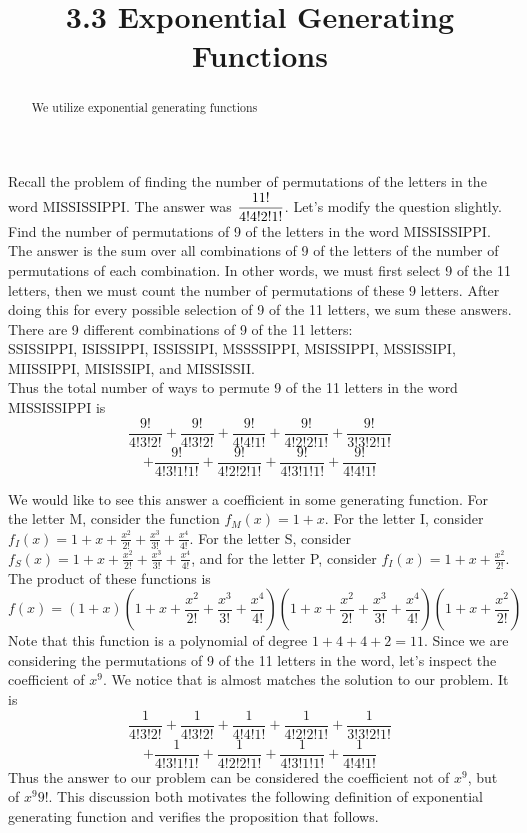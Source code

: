 \documentclass[handout]{ximera}
\title{3.3 Exponential Generating Functions}
\begin{document}
\begin{abstract}
We utilize exponential generating functions
\end{abstract}

\maketitle

Recall the problem of finding the number of permutations of the letters in the word MISSISSIPPI. The answer was $\displaystyle \frac{11!}{4!4!2!1!}$.
Let's modify the question slightly.  Find the number of permutations of 9 of the letters in the word MISSISSIPPI. 
The answer is the sum over all combinations of 9 of the letters of the number of permutations of each combination. 
In other words, we must first select 9 of the 11 letters, then we must count the number of permutations of these 9 letters.  
After doing this for every possible selection of 9 of the 11 letters, we sum these answers.
There are 9 different combinations of 9 of the 11 letters:\\
SSISSIPPI, ISISSIPPI, ISSISSIPI, MSSSSIPPI, MSISSIPPI, MSSISSIPI, MIISSIPPI, MISISSIPI, and MISSISSII.\\
Thus the total number of ways to permute 9 of the 11 letters in the word MISSISSIPPI is
\[
\frac{9!}{4!3!2!} + \frac{9!}{4!3!2!} + \frac{9!}{4!4!1!} + \frac{9!}{4!2!2!1!} + \frac{9!}{3!3!2!1!} 
\]
\[
+ \frac{9!}{4!3!1!1!} + \frac{9!}{4!2!2!1!} + \frac{9!}{4!3!1!1!} + \frac{9!}{4!4!1!}
\]
 
We would like to see this answer a coefficient in some generating function.
For the letter M, consider the function $f_M(x) = 1+x$. For the letter I, consider $f_I(x) = 1 + x + \frac{x^2}{2!} + \frac{x^3}{3!} + \frac{x^4}{4!}$.
For the letter S, consider $f_S(x) = 1 + x + \frac{x^2}{2!} + \frac{x^3}{3!} + \frac{x^4}{4!}$,
and for the letter P, consider $f_I(x) = 1 + x + \frac{x^2}{2!}$.
The product of these functions is
\[
f(x) = \left(1+x\right)\left(1+x+\frac{x^2}{2!} + \frac{x^3}{3!} + \frac{x^4}{4!}\right)\left(1+x+\frac{x^2}{2!} + \frac{x^3}{3!} + \frac{x^4}{4!}\right)
\left(1+x+\frac{x^2}{2!}\right)
\]
Note that this function is a polynomial of degree $1+4+4+2 = 11$. 
Since we are considering the permutations of 9 of the 11 letters in the word, let's inspect the coefficient of $x^9$.
We notice that is almost matches the solution to our problem. It is
\[
\frac{1}{4!3!2!} + \frac{1}{4!3!2!} + \frac{1}{4!4!1!} + \frac{1}{4!2!2!1!} + \frac{1}{3!3!2!1!} 
\]
\[
+ \frac{1}{4!3!1!1!} + \frac{1}{4!2!2!1!} + \frac{1}{4!3!1!1!} + \frac{1}{4!4!1!}
\]
Thus the answer to our problem can be considered the coefficient not of $x^9$, but of ${x^9}{9!}$. This discussion both motivates the following definition of exponential
generating function and verifies the proposition that follows.
\end{document}
